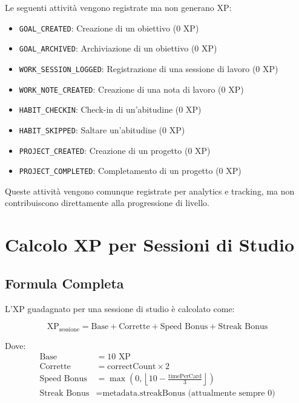 \documentclass[11pt,a4paper]{article}
\begin{document}
Le seguenti attività vengono registrate ma non generano XP:
\begin{itemize}
    \item \texttt{GOAL\_CREATED}: Creazione di un obiettivo (0 XP)
    \item \texttt{GOAL\_ARCHIVED}: Archiviazione di un obiettivo (0 XP)
    \item \texttt{WORK\_SESSION\_LOGGED}: Registrazione di una sessione di lavoro (0 XP)
    \item \texttt{WORK\_NOTE\_CREATED}: Creazione di una nota di lavoro (0 XP)
    \item \texttt{HABIT\_CHECKIN}: Check-in di un'abitudine (0 XP)
    \item \texttt{HABIT\_SKIPPED}: Saltare un'abitudine (0 XP)
    \item \texttt{PROJECT\_CREATED}: Creazione di un progetto (0 XP)
    \item \texttt{PROJECT\_COMPLETED}: Completamento di un progetto (0 XP)
\end{itemize}

Queste attività vengono comunque registrate per analytics e tracking, ma non contribuiscono direttamente alla progressione di livello.

\section{Calcolo XP per Sessioni di Studio}

\subsection{Formula Completa}

L'XP guadagnato per una sessione di studio è calcolato come:

\begin{equation}
\text{XP}_{\text{sessione}} = \text{Base} + \text{Corrette} + \text{Speed Bonus} + \text{Streak Bonus}
\end{equation}

Dove:
\begin{align}
\text{Base} &= 10 \text{ XP} \\
\text{Corrette} &= \text{correctCount} \times 2 \\
\text{Speed Bonus} &= \max\left(0, \left\lfloor 10 - \frac{\text{timePerCard}}{3} \right\rfloor\right) \\
\text{Streak Bonus} &= \text{metadata.streakBonus} \text{ (attualmente sempre 0)}
\end{align}
\end{document}
